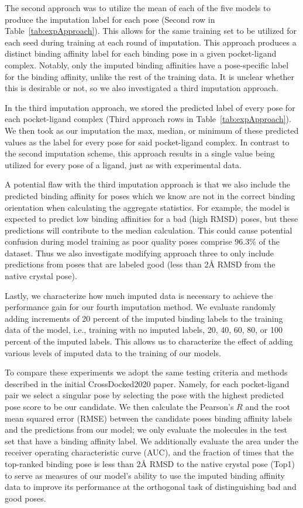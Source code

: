 \documentclass[journal=jmcmar,manuscript=article]{achemso}
\begin{document}
The second approach was to utilize the mean of each of the five models to produce the imputation label for each pose (Second row in Table~\ref{tab:expApproach}).
This allows for the same training set to be utilized for each seed during training at each round of imputation.
This approach produces a distinct binding affinity label for each binding pose in a given pocket-ligand complex.
Notably, only the imputed binding affinities have a pose-specific label for the binding affinity, unlike the rest of the training data.
It is unclear whether this is desirable or not, so we also investigated a third imputation approach.

In the third imputation approach, we stored the predicted label of every pose for each pocket-ligand complex (Third approach rows in Table~\ref{tab:expApproach}).
We then took as our imputation the max, median, or minimum of these predicted values as the label for every pose for said pocket-ligand complex.
In contrast to the second imputation scheme, this approach results in a single value being utilized for every pose of a ligand, just as with experimental data.

A potential flaw with the third imputation approach is that we also include the predicted binding affinity for poses which we know are not in the correct binding orientation when calculating the aggregate statistics.  For example, the model is expected to predict low binding affinities for a bad (high RMSD) poses, but these predictions will contribute to the median calculation.
This could cause potential confusion during model training as poor quality poses  comprise 96.3\% of the dataset.
Thus we also investigate modifying approach three to only include predictions from poses that are labeled good (less than 2{\AA} RMSD from the native crystal pose).

Lastly, we characterize how much imputed data is necessary to achieve the performance gain for our fourth imputation method.
We evaluate randomly adding increments of 20 percent of the imputed binding labels to the training data of the model, i.e., training with no imputed labels, 20, 40, 60, 80, or 100 percent of the imputed labels.
This allows us to characterize the effect of adding various levels of imputed data to the training of our models.

To compare these experiments we adopt the same testing criteria and methods described in the initial CrossDocked2020 paper\cite{crossdocked2020}.
Namely, for each pocket-ligand pair we select a singular pose by selecting the pose with the highest predicted pose score to be our candidate. 
We then calculate the Pearson's $R$ and the root mean squared error (RMSE) between the candidate poses binding affinity labels and the predictions from our model; we only evaluate the molecules in the test set that have a binding affinity label.
We additionally evaluate the area under the receiver operating characteristic curve (AUC), and the fraction of times that the top-ranked binding pose is less than 2{\AA} RMSD to the native crystal pose (Top1) to serve as measures of our model's ability to use the imputed binding affinity data to improve its performance at the orthogonal task of distinguishing bad and good poses.
\end{document}
